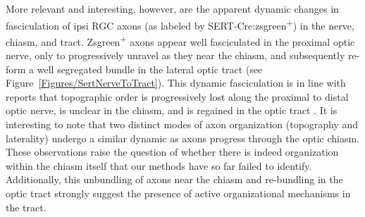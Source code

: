 More relevant and interesting, however, are the apparent dynamic changes in fasciculation of ipsi RGC axons (as labeled by SERT-Cre:zsgreen\textsuperscript{+}) in the nerve, chiasm, and tract.
Zsgreen\textsuperscript{+} axons appear well fasciculated in the proximal optic nerve, only to progressively unravel as they near the chiasm, and subsequently re-form a well segregated bundle in the lateral optic tract (see Figure~\ref{Figures/SertNerveToTract}).
This dynamic fasciculation is in line with reports that topographic order is progressively lost along the proximal to distal optic nerve, is unclear in the chiasm, and is regained in the optic tract \cite{chan1999changes,chan1994changes,plas2005pretarget,reese1993reestablishment,reh1983organization,torrealba1982studies}.
It is interesting to note that two distinct modes of axon organization (topography and laterality) undergo a similar dynamic as axons progress through the optic chiasm.
These observations raise the question of whether there is indeed organization within the chiasm itself that our methods have so far failed to identify.
Additionally, this unbundling of axons near the chiasm and re-bundling in the optic tract strongly suggest the presence of active organizational mechanisms in the tract. 